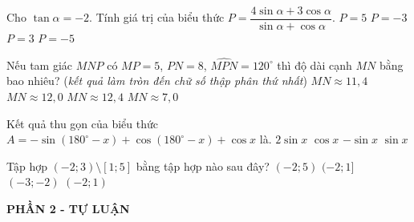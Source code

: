 \begin{ex}%
	Cho $\tan \alpha=-2$. Tính giá trị của biểu thức $P=\dfrac{4\sin \alpha+3\cos \alpha}{\sin \alpha +\cos \alpha}$.
	\choice
	{\True $P=5$}
	{$P=-3$}
	{$P=3$}
	{$P=-5$}
\end{ex}

\begin{ex}%
	Nếu tam giác $MNP$ có $MP=5$, $PN=8$, $\widehat{MPN}=120^\circ$ thì độ dài cạnh $MN$ bằng bao nhiêu? (\textit{kết quả làm tròn đến chữ số thập phân thứ nhất})
	\choice
	{\True $MN \approx 11{,}4$}
	{$MN \approx 12{,}0$}
	{$MN \approx 12{,}4$}
	{$MN \approx 7{,}0$}
\end{ex}

\begin{ex}%
	Kết quả thu gọn của biểu thức $A=-\sin (180^\circ -x)+\cos (180^\circ-x)+\cos x$ là.
	\choice
	{$2\sin x$}
	{$\cos x$}
	{\True $-\sin x$}
	{$\sin x$}
\end{ex}

\begin{ex}%
	Tập hợp $(-2;3) \setminus [1;5]$ bằng tập hợp nào sau đây?
	\choice
	{$(-2;5)$}
	{$(-2;1]$}
	{$(-3;-2)$}
	{\True $(-2;1)$}
\end{ex}




\begin{center}
	\textbf{PHẦN 2 - TỰ LUẬN}
\end{center}

